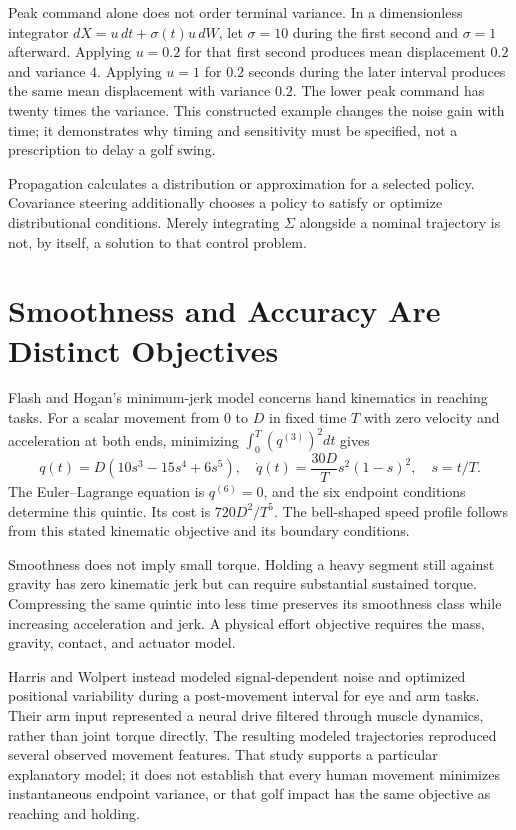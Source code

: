 Peak command alone does not order terminal variance. In a dimensionless integrator $dX=u\,dt+\sigma(t)u\,dW$, let $\sigma=10$ during the first second and $\sigma=1$ afterward. Applying $u=0.2$ for that first second produces mean displacement $0.2$ and variance $4$. Applying $u=1$ for $0.2$ seconds during the later interval produces the same mean displacement with variance $0.2$. The lower peak command has twenty times the variance. This constructed example changes the noise gain with time; it demonstrates why timing and sensitivity must be specified, not a prescription to delay a golf swing.

Propagation calculates a distribution or approximation for a selected policy. Covariance steering additionally chooses a policy to satisfy or optimize distributional conditions. Merely integrating $\Sigma$ alongside a nominal trajectory is not, by itself, a solution to that control problem.

\section{Smoothness and Accuracy Are Distinct Objectives}

Flash and Hogan's minimum-jerk model concerns hand kinematics in reaching tasks. For a scalar movement from $0$ to $D$ in fixed time $T$ with zero velocity and acceleration at both ends, minimizing $\int_0^T(q^{(3)})^2dt$ gives
\begin{equation}
q(t)=D(10s^3-15s^4+6s^5),\quad
\dot q(t)=\frac{30D}{T}s^2(1-s)^2,\quad s=t/T .
\end{equation}
The Euler--Lagrange equation is $q^{(6)}=0$, and the six endpoint conditions determine this quintic. Its cost is $720D^2/T^5$. The bell-shaped speed profile follows from this stated kinematic objective and its boundary conditions.

Smoothness does not imply small torque. Holding a heavy segment still against gravity has zero kinematic jerk but can require substantial sustained torque. Compressing the same quintic into less time preserves its smoothness class while increasing acceleration and jerk. A physical effort objective requires the mass, gravity, contact, and actuator model.

Harris and Wolpert instead modeled signal-dependent noise and optimized positional variability during a post-movement interval for eye and arm tasks. Their arm input represented a neural drive filtered through muscle dynamics, rather than joint torque directly. The resulting modeled trajectories reproduced several observed movement features. That study supports a particular explanatory model; it does not establish that every human movement minimizes instantaneous endpoint variance, or that golf impact has the same objective as reaching and holding.

